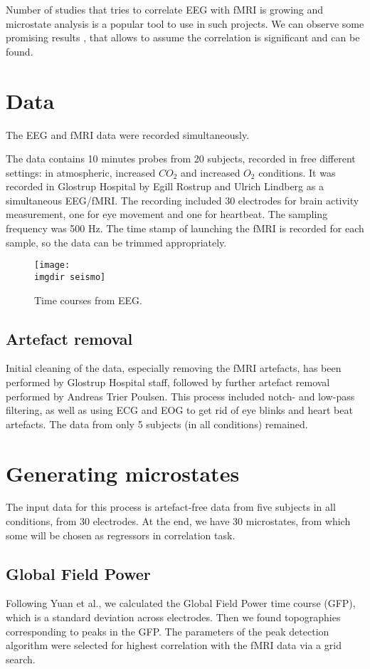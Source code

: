 \documentclass{article}
\newcommand{\imgdir}{Images/} %
\begin{document}
Number of studies that tries to correlate EEG with fMRI is growing and microstate analysis is a popular tool to use in such projects. We can observe some promising results \cite{Yuan20122062}, that allows to assume the correlation is significant and can be found. 




\section{Data}
\label{sec:data}

The EEG and fMRI data were recorded simultaneously. 

The data contains 10 minutes probes from 20 subjects, recorded in free different settings: in atmospheric, increased $CO_2$ and increased $O_2$ conditions. It was recorded in Glostrup Hospital by Egill Rostrup and Ulrich Lindberg as a simultaneous EEG/fMRI. The recording included 30 electrodes for brain activity measurement, one for eye movement and one for heartbeat. The sampling frequency was 500 Hz. The time stamp of launching the fMRI is recorded for each sample, so the data can be trimmed appropriately.

\begin{figure}[!ht]
    \centering
    \texttt{[image: \\imgdir seismo]}
    \caption{Time courses from EEG.}
    \label{fig:eeg}
\end{figure}

\subsection{Artefact removal}
Initial cleaning of the data, especially removing the fMRI artefacts, has been performed by Glostrup Hospital staff, followed by further artefact removal performed by Andreas Trier Poulsen. This process included notch- and low-pass filtering, as well as using ECG and EOG to get rid of eye blinks and heart beat artefacts. 
The data from only 5 subjects (in all conditions) remained.

\section{Generating microstates}
The input data for this process is artefact-free data from five subjects in all conditions, from 30 electrodes. At the end, we have 30 microstates, from which some will be chosen as regressors in correlation task. 
\subsection{Global Field Power}
Following Yuan et al., we calculated the Global Field Power time course (GFP), which is a standard deviation across electrodes. Then we found topographies corresponding to peaks in the GFP. The parameters of the peak detection algorithm were selected for highest correlation with the fMRI data via a grid search.
\end{document}
